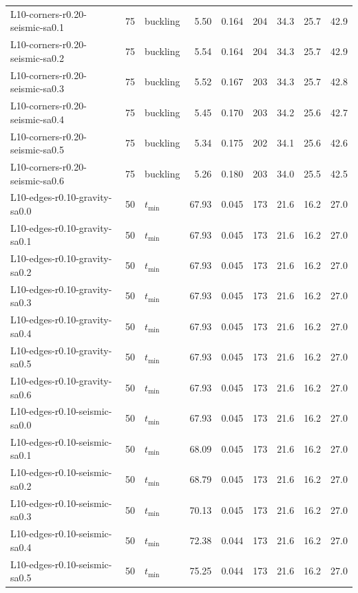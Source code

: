 \begin{longtable}{lrlrrrrrr}
L10-corners-r0.20-seismic-sa0.1 & 75 & buckling & 5.50 & 0.164 & 204 & 34.3 & 25.7 & 42.9 \\
L10-corners-r0.20-seismic-sa0.2 & 75 & buckling & 5.54 & 0.164 & 204 & 34.3 & 25.7 & 42.9 \\
L10-corners-r0.20-seismic-sa0.3 & 75 & buckling & 5.52 & 0.167 & 203 & 34.3 & 25.7 & 42.8 \\
L10-corners-r0.20-seismic-sa0.4 & 75 & buckling & 5.45 & 0.170 & 203 & 34.2 & 25.6 & 42.7 \\
L10-corners-r0.20-seismic-sa0.5 & 75 & buckling & 5.34 & 0.175 & 202 & 34.1 & 25.6 & 42.6 \\
L10-corners-r0.20-seismic-sa0.6 & 75 & buckling & 5.26 & 0.180 & 203 & 34.0 & 25.5 & 42.5 \\
L10-edges-r0.10-gravity-sa0.0 & 50 & $t_{\mathrm{min}}$ & 67.93 & 0.045 & 173 & 21.6 & 16.2 & 27.0 \\
L10-edges-r0.10-gravity-sa0.1 & 50 & $t_{\mathrm{min}}$ & 67.93 & 0.045 & 173 & 21.6 & 16.2 & 27.0 \\
L10-edges-r0.10-gravity-sa0.2 & 50 & $t_{\mathrm{min}}$ & 67.93 & 0.045 & 173 & 21.6 & 16.2 & 27.0 \\
L10-edges-r0.10-gravity-sa0.3 & 50 & $t_{\mathrm{min}}$ & 67.93 & 0.045 & 173 & 21.6 & 16.2 & 27.0 \\
L10-edges-r0.10-gravity-sa0.4 & 50 & $t_{\mathrm{min}}$ & 67.93 & 0.045 & 173 & 21.6 & 16.2 & 27.0 \\
L10-edges-r0.10-gravity-sa0.5 & 50 & $t_{\mathrm{min}}$ & 67.93 & 0.045 & 173 & 21.6 & 16.2 & 27.0 \\
L10-edges-r0.10-gravity-sa0.6 & 50 & $t_{\mathrm{min}}$ & 67.93 & 0.045 & 173 & 21.6 & 16.2 & 27.0 \\
L10-edges-r0.10-seismic-sa0.0 & 50 & $t_{\mathrm{min}}$ & 67.93 & 0.045 & 173 & 21.6 & 16.2 & 27.0 \\
L10-edges-r0.10-seismic-sa0.1 & 50 & $t_{\mathrm{min}}$ & 68.09 & 0.045 & 173 & 21.6 & 16.2 & 27.0 \\
L10-edges-r0.10-seismic-sa0.2 & 50 & $t_{\mathrm{min}}$ & 68.79 & 0.045 & 173 & 21.6 & 16.2 & 27.0 \\
L10-edges-r0.10-seismic-sa0.3 & 50 & $t_{\mathrm{min}}$ & 70.13 & 0.045 & 173 & 21.6 & 16.2 & 27.0 \\
L10-edges-r0.10-seismic-sa0.4 & 50 & $t_{\mathrm{min}}$ & 72.38 & 0.044 & 173 & 21.6 & 16.2 & 27.0 \\
L10-edges-r0.10-seismic-sa0.5 & 50 & $t_{\mathrm{min}}$ & 75.25 & 0.044 & 173 & 21.6 & 16.2 & 27.0 \\

\end{longtable}
